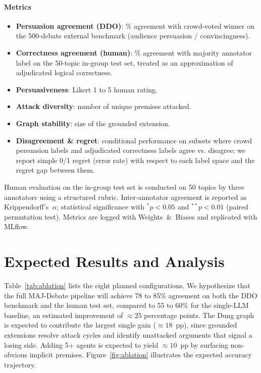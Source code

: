 \documentclass[11pt,twocolumn,letterpaper]{article}
\newcommand{\HumanTestTopics}{50}
\newcommand{\BaselineAccLo}{55}
\newcommand{\BaselineAccHi}{60}
\newcommand{\FullAccLo}{78}
\newcommand{\FullAccHi}{85}
\newcommand{\GraphGain}{18}
\newcommand{\AgentGain}{10}
\newcommand{\TotalGain}{25}
\newcommand{\DDOSample}{500}
\begin{document}
\paragraph{Metrics}
\begin{itemize}
  \item \textbf{Persuasion agreement (DDO)}: \% agreement with crowd-voted
    winner on the \DDOSample-debate external benchmark (audience
    persuasion / convincingness).
  \item \textbf{Correctness agreement (human)}: \% agreement with majority
    annotator label on the \HumanTestTopics-topic in-group test set,
    treated as an approximation of adjudicated logical correctness.
  \item \textbf{Persuasiveness}: Likert 1 to 5 human rating.
  \item \textbf{Attack diversity}: number of unique premises attacked.
  \item \textbf{Graph stability}: size of the grounded extension.
  \item \textbf{Disagreement \& regret}: conditional performance on
    subsets where crowd persuasion labels and adjudicated correctness
    labels agree vs. disagree; we report simple 0/1 regret (error rate)
    with respect to each label space and the regret gap between them.
\end{itemize}

Human evaluation on the in-group test set is conducted on 50 topics by
three annotators using a structured rubric. Inter-annotator agreement is
reported as Krippendorff's~$\alpha$; statistical significance with
${}^{*}p{<}0.05$ and ${}^{**}p{<}0.01$ (paired permutation test).
Metrics are logged with Weights~\&~Biases and replicated with MLflow.

\section{Expected Results and Analysis}

Table~\ref{tab:ablation} lists the eight planned configurations.
We hypothesize that the full MAJ-Debate pipeline will achieve
\FullAccLo{} to \FullAccHi\% agreement on both the DDO benchmark and the
human test set, compared to \BaselineAccLo{} to \BaselineAccHi\% for the
single-LLM baseline, an estimated improvement of
${\approx}\TotalGain{}$ percentage points.
The Dung graph is expected to contribute the largest single gain
(${\approx}\GraphGain{}$~pp), since grounded extensions resolve attack cycles
and identify unattacked arguments that signal a losing side. Adding 5+
agents is expected to yield ${\approx}\AgentGain{}$~pp by surfacing
non-obvious implicit premises. Figure~\ref{fig:ablation} illustrates the
expected accuracy trajectory.
\end{document}
